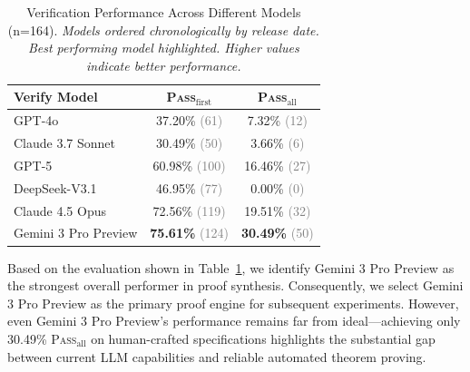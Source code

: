 \begin{table}[!t]
\centering
\caption{Verification Performance Across Different Models (n=164). {\footnotesize\textit{Models ordered chronologically by release date. Best performing model highlighted. Higher values indicate better performance.}}}
\label{tab:verification}
\small
\begin{tabular}{@{} l c c @{}}
\toprule
\textbf{Verify Model} & \textbf{\textsc{Pass}$_{\text{first}}$} & \textbf{\textsc{Pass}$_{\text{all}}$} \\
\midrule
GPT-4o            & 37.20\% \textcolor{gray}{(61)}  & 7.32\% \textcolor{gray}{(12)} \\
Claude 3.7 Sonnet & 30.49\% \textcolor{gray}{(50)}  & 3.66\% \textcolor{gray}{(6)}  \\
GPT-5             & 60.98\% \textcolor{gray}{(100)} & 16.46\% \textcolor{gray}{(27)} \\
DeepSeek-V3.1     & 46.95\% \textcolor{gray}{(77)}  & 0.00\% \textcolor{gray}{(0)}  \\
Claude 4.5 Opus   & 72.56\% \textcolor{gray}{(119)} & 19.51\% \textcolor{gray}{(32)} \\
\rowcolor{cyan!8}
Gemini 3 Pro Preview & \textcolor{cyan!70!black}{\textbf{75.61\%}} \textcolor{gray}{(124)} & \textcolor{cyan!70!black}{\textbf{30.49\%}} \textcolor{gray}{(50)} \\
\bottomrule
\end{tabular}
\end{table}


Based on the evaluation shown in Table~\ref{tab:verification}, we identify Gemini 3 Pro Preview as the strongest overall performer in proof synthesis. Consequently, we select Gemini 3 Pro Preview as the primary proof engine for subsequent experiments. However, even Gemini 3 Pro Preview's performance remains far from ideal—achieving only 30.49\% \textsc{Pass}$_{\text{all}}$ on human-crafted specifications highlights the substantial gap between current LLM capabilities and reliable automated theorem proving.
